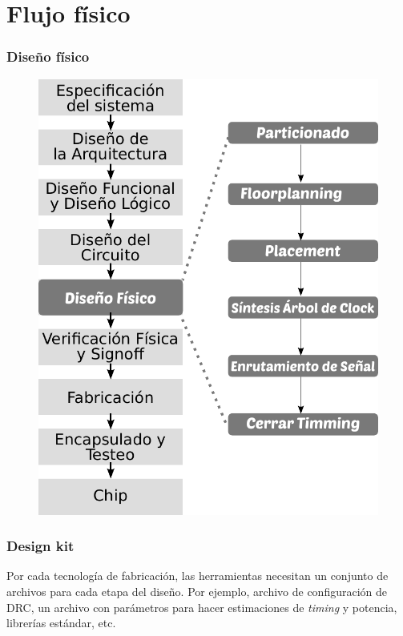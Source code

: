 \documentclass{beamer}
\begin{document}
\section{Flujo físico}
\begin{frame}
  \frametitle{Diseño físico}

 \begin{figure}[h]
 \centering
 \includegraphics[scale=0.40]{figuras/DisenioFisico.pdf}
 \end{figure}

\end{frame}
\begin{frame}
\frametitle{Design kit}
Por cada tecnología de fabricación, las herramientas necesitan un conjunto de archivos para cada etapa del diseño. Por ejemplo, archivo de configuración de DRC, un archivo con parámetros para hacer estimaciones de  \emph{timing} y potencia, librerías estándar, etc.


\end{frame}
\end{document}

